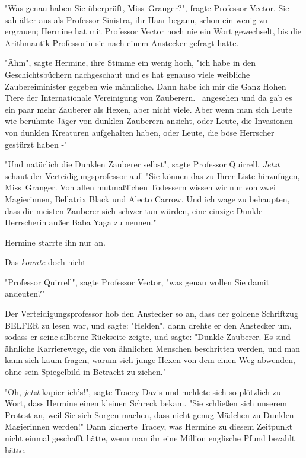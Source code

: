 {"Was genau haben Sie überprüft, Miss~Granger?", fragte Professor Vector. Sie sah älter aus als Professor Sinistra, ihr Haar begann, schon ein wenig zu ergrauen; Hermine hat mit Professor Vector noch nie ein Wort gewechselt, bis die Arithmantik-Professorin sie nach einem Anstecker gefragt hatte.

"Ähm", sagte Hermine, ihre Stimme ein wenig hoch, "ich habe in den Geschichtsbüchern nachgeschaut und es hat genauso viele weibliche Zaubereiminister gegeben wie männliche. Dann habe ich mir die Ganz Hohen Tiere der Internationale Vereinigung von Zauberern. ~angesehen und da gab es ein paar mehr Zauberer als Hexen, aber nicht viele. Aber wenn man sich Leute wie berühmte Jäger von dunklen Zauberern ansieht, oder Leute, die Invasionen von dunklen Kreaturen aufgehalten haben, oder Leute, die böse Herrscher gestürzt haben -"

"Und natürlich die Dunklen Zauberer selbst", sagte Professor Quirrell. \emph{Jetzt} schaut der Verteidigungsprofessor auf. "Sie können das zu Ihrer Liste hinzufügen, Miss~Granger. Von allen mutmaßlichen Todessern wissen wir nur von zwei Magierinnen, Bellatrix Black und Alecto Carrow. Und ich wage zu behaupten, dass die meisten Zauberer sich schwer tun würden, eine einzige Dunkle Herrscherin außer Baba Yaga zu nennen."

Hermine starrte ihn nur an.

Das \emph{konnte} doch nicht -

"Professor Quirrell", sagte Professor Vector, "was genau wollen Sie damit andeuten?"

Der Verteidigungsprofessor hob den Anstecker so an, dass der goldene Schriftzug BELFER zu lesen war, und sagte: "Helden", dann drehte er den Anstecker um, sodass er seine silberne Rückseite zeigte, und sagte: "Dunkle Zauberer. Es sind ähnliche Karrierewege, die von ähnlichen Menschen beschritten werden, und man kann sich kaum fragen, warum sich junge Hexen von dem einen Weg abwenden, ohne sein Spiegelbild in Betracht zu ziehen."

"Oh, \emph{jetzt} kapier ich's!", sagte Tracey Davis und meldete sich so plötzlich zu Wort, dass Hermine einen kleinen Schreck bekam. "Sie schließen sich unserem Protest an, weil Sie sich Sorgen machen, dass nicht genug Mädchen zu Dunklen Magierinnen werden!" Dann kicherte Tracey, was Hermine zu diesem Zeitpunkt nicht einmal geschafft hätte, wenn man ihr eine Million englische Pfund bezahlt hätte.

}
